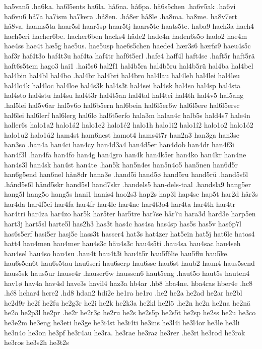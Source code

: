 ha5van5
.ha6ka.
ha6l5ents
ha6la.
hå6na.
hå6pa.
hä6s5chen
.ha6v5ak
.ha6vi
ha6vu6
hå7a
ha7ism
ha7kera
.hå8en.
.hå8er
hå8le
.ha8ma.
ha8me.
ha8v7ert
hå8va.
haams5ta
haar5sl
haar5sp
haar5tj
haars5te
haats5te.
haba9
hach3a
hach4
hach5eri
hacher6be.
hacher6ben
hacks4
häde2
hade4n
haden6s5o
hado2
hae4m
hae4ss
hae4t
hæ5g
hae5us.
hae5usp
hae6s5chen
haede4
hær3s6
hærfø9
haeu4s5c
haf3r
haf4t3o
haf4t3u
haf4ta
haf4tr
haf6t5erl
.hafe4
haff4l
haft4se
.haft5r
haft5rä
haft6s5tem
hago3
hai1
.hai5s6
hal2f1
hal4b5ra
hal4b5ru
hal4b5rü
hal4ba
hal4bel
hal4bin
hal4bl
hal4bo
.hal4br
hal4bri
hal4bro
hal4lau
hal4leh
hal4lei
hal4leu
hal4lo4k
hal4loc
hal4loe
hal4s3k
hal4s3t
hal4sei
hal4sk
hal4so
hal4sp
hal4sta
hal4sto
hal4stu
hal4su
hal4t3r
hal4t5an
hal4tal
hal4tei
hal4th
hal4v5
hal5ang
.hal5lei
hal5v6ar
hal5v6o
hal6b5ern
hal6bein
hal6l5er6w
hal6l5ere
hal6l5ersc
hal6lei
hal6lerf
hal6lerg
hal6lø
hal6t5erfo
hala3m
halan4c
halb5s
hald4s7
hale4n
haller6s
halo1a2
halo1á2
halo1e2
halo1é2
halo1h
halo1i2
halo1í2
halo1o2
halo1ó2
halo1u2
halo1ú2
ham4st
ham6nest
hamot4
hams4t7r
han2n3
han3ga
han3se
han3so
.han4a
han4ci
han4cy
han4d3a4
han4d5er
han4dob
han4dr
han4f3i
han4f3l
.han4fa
han4fo
han4g
han4gro
han4k
han4k5er
han4ko
han4kr
han4ne
han4s3l
han4sk
han4st
han4te
.han5k
han5n4es
han5n4o5
han5nen
han6d5r
han6g5end
han6nel
hån8dr
hana3e
.hand5i
hand5ø
hand5ru
hand5rü
.hand5s6l
.hånd5s6l
hånd5skr
hand5sl
hand7skr
.handels5
han-dels-taal
.handsla9
hang5er
hang5l
hang5o
hang5s
hani1
hanis4
hao2s3
hap2s
hap3l
hap4se
hap5t
har2d
hår3s
har4da
har4f5ei
har4fa
har4fr
har4le
har4ne
har4t3o4
har4ta
har4th
har4tr
har4tri
har4za
har4zo
har5k
har5ter
har5tre
har7se
hår7u
hara3d
hard3e
harp5en
hart3j
hart5sl
harte5l
has2h3
has3t
has4c
has4sa
has4sp
has5s
has5v
has6p7l
has6s5erf
hasi5er
hasj5e
hass3t
hasser4
hat3s
hat4zer
hat5ein
hat5j
hat6le
hatos4
hatt4
hau4men
hau4mer
hau4s3c
häu4s3c
hau4s5ti
.hau4sa
hau4sac
hau4seh
hau4sel
hau4so
hau4su
.hau4t
hau4t3i
hau4t5r
hau5f6lie
hau5flu
hau5ke.
hau6s5en6t
hau6s5tau
hau6seri
hau6serp
hau6sse
hau6st
haub2
haun4
haus5send
haus5sk
haus5ur
hause4r
.hauser6w
haussen6
haut5eng
.haut5o
haut5s
hauten4
hav1ø
hav4a
hav4sl
have3s
havil4
haz3a
hb4ar
.hb8
hba4ne.
hba4ras
hber4e
.hc8
.hć8
hchar4
hcre2
.hd8
hdan2
hdi2e
he1ra
he1ro
.he2
he2a
he2ad
he2ar
he2bl
he2d9r
he2f
he2fu
he2g3r
he2i
he2k
he2k3a
he2kl
he2lö
.he2n
he2n
he2na
he2nä
he2o
he2p3l
he2pr
.he2r
he2r3ø
he2ru
he2s
he2s5p
he2s5t
he2sp
he2ss
he2u
he3co
he3e2m
he3eng
he3eti
he3ge
he3i4st
he3i4ti
he3ins
he3l4i
he3l4or
he3le
he3li
he3n4o
he3on
he3pf
he3r4au
he3ra.
he3rae
he3raz
he3rer
.he3ri
he3rod
he3rok
he3ros
he3s2h
he3t2s
